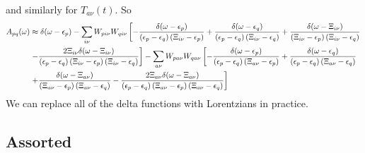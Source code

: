 and similarly for $T_{a\nu}(t)$. So
\begin{align}
    A_{pq}(\omega) &\approx \delta(\omega - \epsilon_p) - \sum_{i\nu} W_{p i \nu} W_{q i \nu} \left[-\frac{\delta(\omega - \epsilon_p)}{\left(\epsilon_p-\epsilon_q\right)\left(\Xi_{i\nu}-\epsilon_p\right)} + \frac{\delta(\omega - \epsilon_q)}{\left(\epsilon_p-\epsilon_q\right)\left(\Xi_{i\nu}-\epsilon_q\right)} + \frac{\delta(\omega - \Xi_{i\nu})}{\left(\Xi_{i\nu}-\epsilon_p\right)\left(\Xi_{i\nu}-\epsilon_q\right)} \right. \\
&\left. - \frac{2\Xi_{i\nu}\delta(\omega - \Xi_{i\nu})}{\left(\epsilon_p-\epsilon_q\right)\left(\Xi_{i\nu}-\epsilon_p\right)\left(\Xi_{i\nu}-\epsilon_q\right)}\right] - \sum_{a\nu} W_{p a \nu} W_{q a \nu} \left[-\frac{\delta(\omega - \epsilon_p)}{\left(\epsilon_p-\epsilon_q\right)\left({\Xi}_{a\nu}-\epsilon_p\right)} + \frac{\delta(\omega - \epsilon_q)}{\left(\epsilon_p-\epsilon_q\right)\left({\Xi}_{a\nu}-\epsilon_q\right)} \right. \\
& \left.+ \frac{\delta(\omega - {\Xi}_{a\nu})}{\left({\Xi}_{a\nu}-\epsilon_p\right)\left({\Xi}_{a\nu}-\epsilon_q\right)}  - \frac{2{\Xi}_{a\nu}\delta(\omega - {\Xi}_{a\nu})}{\left(\epsilon_p-\epsilon_q\right)\left({\Xi}_{a\nu}-\epsilon_p\right)\left({\Xi}_{a\nu}-\epsilon_q\right)}\right] \notag
\end{align}
We can replace all of the delta functions with Lorentzians in practice.
\subsection{Assorted}
